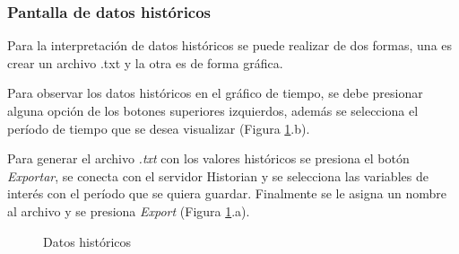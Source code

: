 \subsubsection{Pantalla de datos históricos} \label{sec:graf2}
Para la interpretación de datos históricos se puede realizar de dos formas, una es crear un archivo .txt y la otra es de forma gráfica. 

Para observar los datos históricos en el gráfico de tiempo, se debe presionar alguna opción de los botones superiores izquierdos, además se selecciona el período de tiempo que se desea visualizar (Figura \ref{fig:scada3a3}.b).

Para generar el archivo \textit{.txt} con los valores históricos se presiona el botón \textit{Exportar}, se conecta con el servidor Historian y se selecciona las variables de interés con el período que se quiera guardar.
Finalmente se le asigna un nombre al archivo y se presiona \textit{Export} (Figura \ref{fig:scada3a3}.a).


\begin{figure}[htbp]
	\centering
	\caption{Datos históricos} \label{fig:scada3a3}
\end{figure}



\newpage